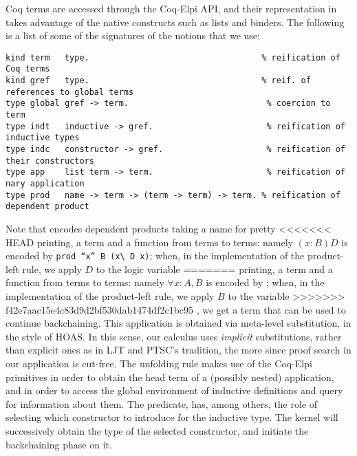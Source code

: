 Coq terms are accessed through the Coq-Elpi API, and their representation
in \lP takes advantage of the native \lP constructs such as lists and binders.
The following is a list of some of the signatures of the notions that we use:
\begin{lstlisting}[language=lprolog]
kind term   type.                                   % reification of Coq terms
kind gref   type.                                   % reif. of references to global terms
type global gref -> term.                            % coercion to term
type indt   inductive -> gref.                       % reification of inductive types
type indc   constructor -> gref.                     % reification of their constructors 
type app    list term -> term.                       % reification of nary application
type prod   name -> term -> (term -> term) -> term. % reification of dependent product
\end{lstlisting}

Note that  encodes dependent products taking a name for pretty
<<<<<<< HEAD
printing, a term and a \lP function from terms to terms: namely $(x :
B) D$ is encoded by \texttt{prod ``x'' B (x\textbackslash{} D x)}; when, in the
implementation of the product-left rule, we apply $D$ to the logic variable
=======
printing, a term and a \lP function from terms to terms: namely $\forall x :
A, B$ is encoded by ; when, in the
implementation of the product-left rule, we apply $B$ to the variable
>>>>>>> f42e7aac15e4c83d9d2bf530dab1474df2c1bc95
, we get a term that can be used to continue backchaining. This
application is obtained via meta-level substitution, in the style of HOAS. In
this sense, our calculus uses \emph{implicit} substitutions, rather than
explicit ones as in LJT and PTSC's tradition, the more since proof search in
our application is cut-free.
The unfolding rule makes use of the Coq-Elpi primitives
 in order to obtain the head term of a (possibly
nested) application, and  in order to access the global
environment of inductive definitions and query for information about them.
The  predicate,  has, among others, the role of selecting which
constructor to introduce for the inductive type. The kernel will successively
obtain the type of the selected constructor, and initiate the backchaining
phase on it.

